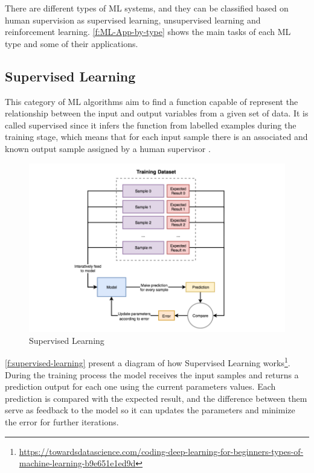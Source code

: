 There are different types of \ac{ML} systems, and they can be classified based on human supervision as supervised learning, unsupervised learning and reinforcement learning. \autoref{f:ML-App-by-type} shows the main tasks of each \ac{ML} type and some of their applications.

\subsection{Supervised Learning}
This category of \ac{ML} algorithms aim to find a function capable of represent the relationship between the input and output variables from a given set of data. It is called supervised since it infers the function from labelled examples during the training stage, which means that for each input sample there is an associated and known output sample assigned by a human supervisor \cite{Batta2020}.

\begin{figure}[h]
\centering
\includegraphics[width=\linewidth]{figures/Ch2/Supervised-Learning.png}
\caption{Supervised Learning}
\label{f:supervised-learning}
\end{figure}

\autoref{f:supervised-learning} present a diagram of how Supervised Learning works\footnote{\url{https://towardsdatascience.com/coding-deep-learning-for-beginners-types-of-machine-learning-b9e651e1ed9d}}. During the training process the model receives the input samples and returns a prediction output for each one using the current parameters values. Each prediction is compared with the expected result, and the difference between them serve as feedback to the model so it can updates the parameters and minimize the error for further iterations.

